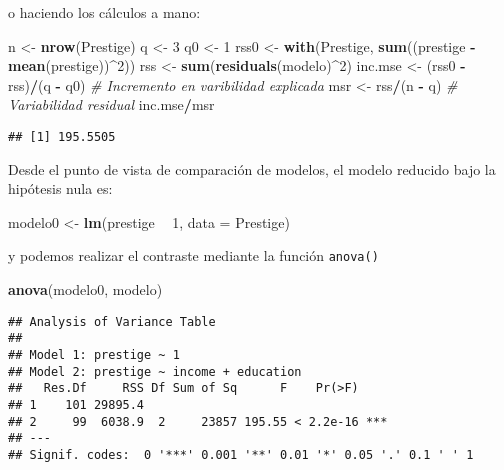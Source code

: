 \documentclass[
]{book}
\newenvironment{Shaded}{\begin{snugshade}}{\end{snugshade}}
\newcommand{\CommentTok}[1]{\textcolor[rgb]{0.56,0.35,0.01}{\textit{#1}}}
\newcommand{\DataTypeTok}[1]{\textcolor[rgb]{0.13,0.29,0.53}{#1}}
\newcommand{\DecValTok}[1]{\textcolor[rgb]{0.00,0.00,0.81}{#1}}
\newcommand{\KeywordTok}[1]{\textcolor[rgb]{0.13,0.29,0.53}{\textbf{#1}}}
\newcommand{\NormalTok}[1]{#1}
\newcommand{\OperatorTok}[1]{\textcolor[rgb]{0.81,0.36,0.00}{\textbf{#1}}}
\newcommand{\StringTok}[1]{\textcolor[rgb]{0.31,0.60,0.02}{#1}}
\theoremstyle{definition}
\theoremstyle{definition}
\theoremstyle{definition}
\theoremstyle{remark}
\begin{document}
o haciendo los cálculos a mano:

\begin{Shaded}
\begin{Highlighting}[]
\NormalTok{n <-}\StringTok{ }\KeywordTok{nrow}\NormalTok{(Prestige)}
\NormalTok{q <-}\StringTok{ }\DecValTok{3}
\NormalTok{q0 <-}\StringTok{ }\DecValTok{1}
\NormalTok{rss0 <-}\StringTok{ }\KeywordTok{with}\NormalTok{(Prestige, }\KeywordTok{sum}\NormalTok{((prestige }\OperatorTok{-}\StringTok{ }\KeywordTok{mean}\NormalTok{(prestige))}\OperatorTok{^}\DecValTok{2}\NormalTok{))}
\NormalTok{rss <-}\StringTok{ }\KeywordTok{sum}\NormalTok{(}\KeywordTok{residuals}\NormalTok{(modelo)}\OperatorTok{^}\DecValTok{2}\NormalTok{)}
\NormalTok{inc.mse <-}\StringTok{ }\NormalTok{(rss0 }\OperatorTok{-}\StringTok{ }\NormalTok{rss)}\OperatorTok{/}\NormalTok{(q }\OperatorTok{-}\StringTok{ }\NormalTok{q0)  }\CommentTok{# Incremento en varibilidad explicada}
\NormalTok{msr <-}\StringTok{  }\NormalTok{rss}\OperatorTok{/}\NormalTok{(n }\OperatorTok{-}\StringTok{ }\NormalTok{q)               }\CommentTok{# Variabilidad residual}
\NormalTok{inc.mse}\OperatorTok{/}\NormalTok{msr}
\end{Highlighting}
\end{Shaded}

\begin{verbatim}
## [1] 195.5505
\end{verbatim}

Desde el punto de vista de comparación de modelos, el modelo
reducido bajo la hipótesis nula es:

\begin{Shaded}
\begin{Highlighting}[]
\NormalTok{modelo0 <-}\StringTok{ }\KeywordTok{lm}\NormalTok{(prestige }\OperatorTok{~}\StringTok{ }\DecValTok{1}\NormalTok{, }\DataTypeTok{data =}\NormalTok{ Prestige)}
\end{Highlighting}
\end{Shaded}

y podemos realizar el contraste mediante la función \texttt{anova()}

\begin{Shaded}
\begin{Highlighting}[]
\KeywordTok{anova}\NormalTok{(modelo0, modelo)}
\end{Highlighting}
\end{Shaded}

\begin{verbatim}
## Analysis of Variance Table
## 
## Model 1: prestige ~ 1
## Model 2: prestige ~ income + education
##   Res.Df     RSS Df Sum of Sq      F    Pr(>F)    
## 1    101 29895.4                                  
## 2     99  6038.9  2     23857 195.55 < 2.2e-16 ***
## ---
## Signif. codes:  0 '***' 0.001 '**' 0.01 '*' 0.05 '.' 0.1 ' ' 1
\end{verbatim}
\end{document}
